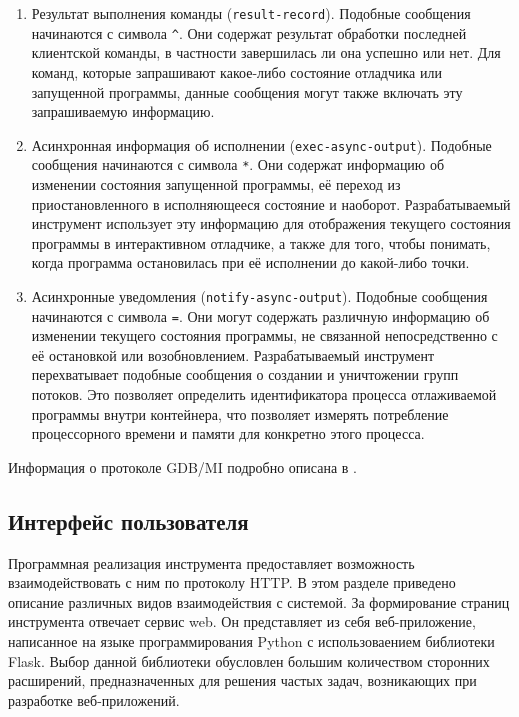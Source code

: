 \documentclass[a4paper,article,14pt]{extarticle}
\begin{document}
\begin{enumerate}
    \item Результат выполнения команды (\texttt{result-record}). Подобные сообщения начинаются с символа \texttt{\^}. Они содержат результат обработки последней клиентской команды, в частности завершилась ли она успешно или нет. Для команд, которые запрашивают какое-либо состояние отладчика или запущенной программы, данные сообщения могут также включать эту запрашиваемую информацию.
    \item Асинхронная информация об исполнении (\texttt{exec-async-output}). Подобные сообщения начинаются с символа \texttt{*}. Они содержат информацию об изменении состояния запущенной программы, её переход из приостановленного в исполняющееся состояние и наоборот. Разрабатываемый инструмент использует эту информацию для отображения текущего состояния программы в интерактивном отладчике, а также для того, чтобы понимать, когда программа остановилась при её исполнении до какой-либо точки.
    \item Асинхронные уведомления (\texttt{notify-async-output}). Подобные сообщения начинаются с символа \texttt{=}. Они могут содержать различную информацию об изменении текущего состояния программы, не связанной непосредственно с её остановкой или возобновлением. Разрабатываемый инструмент перехватывает подобные сообщения о создании и уничтожении групп потоков. Это позволяет определить идентификатора процесса отлаживаемой программы внутри контейнера, что позволяет измерять потребление процессорного времени и памяти для конкретно этого процесса.
\end{enumerate}

Информация о протоколе GDB/MI подробно описана в \cite{gdb}.

\subsection{Интерфейс пользователя}

Программная реализация инструмента предоставляет возможность взаимодействовать с ним по протоколу HTTP. В этом разделе приведено описание различных видов взаимодействия с системой. За формирование страниц инструмента отвечает сервис web. Он представляет из себя веб-приложение, написанное на языке программирования Python с использоваением библиотеки Flask. Выбор данной библиотеки обусловлен большим количеством сторонних расширений, предназначенных для решения частых задач, возникающих при разработке веб-приложений.
\end{document}
